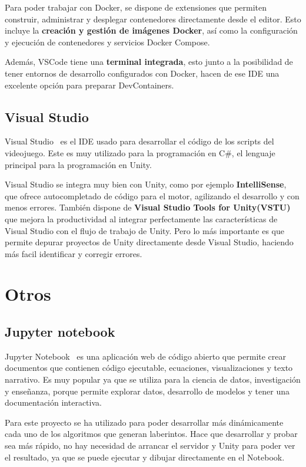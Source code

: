 Para poder trabajar con Docker, se dispone de extensiones que permiten construir, administrar y desplegar contenedores directamente desde el editor. Esto incluye la \textbf{creación y gestión de imágenes Docker}, así como la configuración y ejecución de contenedores y servicios Docker Compose.

Además, VSCode tiene una \textbf{terminal integrada}, esto junto a la posibilidad de tener entornos de desarrollo configurados con Docker, hacen de ese IDE una excelente opción para preparar DevContainers. 


\subsection{Visual Studio}
Visual Studio~\cite{visualstudio} es el IDE usado para desarrollar el código de los scripts del videojuego. Este es muy utilizado para la programación en C\#, el lenguaje principal para la programación en Unity.  

Visual Studio se integra muy bien con Unity, como por ejemplo \textbf{IntelliSense}, que ofrece autocompletado de código para el motor, agilizando el desarrollo y con menos errores. También dispone de \textbf{Visual Studio Tools for Unity(VSTU)} que mejora la productividad al integrar perfectamente las características de Visual Studio con el flujo de trabajo de Unity. Pero lo más importante es que permite depurar proyectos de Unity directamente desde Visual Studio, haciendo más facil identificar y corregir errores.

\section{Otros}
\subsection{Jupyter notebook}
Jupyter Notebook~\cite{jupyter} es una aplicación web de código abierto que permite crear documentos que contienen código ejecutable, ecuaciones, visualizaciones y texto narrativo. Es muy popular ya que se utiliza para la ciencia de datos, investigación y enseñanza, porque permite explorar datos, desarrollo de modelos y tener una documentación interactiva.

Para este proyecto se ha utilizado para poder desarrollar más dinámicamente cada uno de los algoritmos que generan laberintos. Hace que desarrollar y probar sea más rápido, no hay necesidad de arrancar el servidor y Unity para poder ver el resultado, ya que se puede ejecutar y dibujar directamente en el Notebook. 





